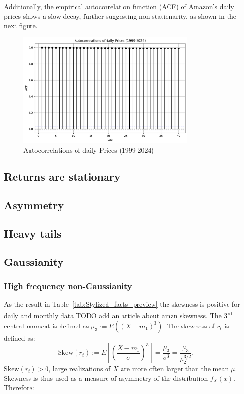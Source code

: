 \documentclass{article}
\begin{document}
\noindent Additionally, the empirical autocorrelation function (ACF) of Amazon's daily prices shows a slow decay, further suggesting non-stationarity, as shown in the next figure.

\begin{figure}[H]
    \centering
    \includegraphics[width=0.8\textwidth]{Img/Autocorrelation.pdf}
    \caption{Autocorrelations of daily Prices (1999-2024)}
    \label{fig:Autocorrelations of daily Prices (1999-2024)}
\end{figure}

\subsection{Returns are stationary}

\subsection{Asymmetry}

\subsection{Heavy tails}

\subsection{Gaussianity}

\subsubsection{High frequency non-Gaussianity}

\noindent As the result in Table~\ref{tab:Stylized_facts_preview} 
the skewness is positive for daily and monthly data \cite{Skewness} TODO add an article about amzn skewness.
The 3\textsuperscript{rd} central moment is defined as
$\mu_3 := E((X - m_1)^3).$ The skewness of \( r_t \) is defined as:
\[
\text{Skew}(r_t) := E \left[ \left( \frac{X - m_1}{\sigma} \right)^3 \right] = \frac{\mu_3}{\sigma^3} = \frac{\mu_3}{\mu_2^{3/2}}.
\]
\( \text{Skew}(r_t) >0 \), large realizations of \( X \) are more often larger
than the mean \( \mu \). 
Skewness is thus used as a measure of asymmetry of the distribution \( f_X(x) \). Therefore:
 
\end{document}
